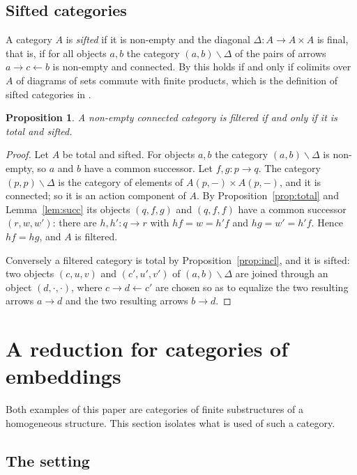 \documentclass[11pt,a4paper]{article}
\newtheorem{proposition}[theorem]{Proposition}
\theoremstyle{definition}
\begin{document}
\subsection{Sifted categories}

A category $A$ is \emph{sifted} if it is non-empty and the diagonal
$\Delta\colon A\to A\times A$ is final, that is, if for all objects $a,b$ the
category $(a,b)\backslash\Delta$ of the pairs of arrows $a\to c\leftarrow b$ is
non-empty and connected. By \cite[Theorem~1.6]{AR} this holds if and only if
colimits over $A$ of diagrams of sets commute with finite products, which is
the definition of sifted categories in \cite[Definition~1.1]{AR}.

\begin{proposition}\label{prop:sifted}
A non-empty connected category is filtered if and only if it is total and
sifted.
\end{proposition}

\begin{proof}
Let $A$ be total and sifted. For objects $a,b$ the category
$(a,b)\backslash\Delta$ is non-empty, so $a$ and $b$ have a common successor.
Let $f,g\colon p\to q$. The category $(p,p)\backslash\Delta$ is the category
of elements of $A(p,-)\times A(p,-)$, and it is connected; so it is an action
component of $A$. By Proposition~\ref{prop:total} and Lemma~\ref{lem:succ}
its objects $(q,f,g)$ and $(q,f,f)$ have a common successor $(r,w,w')$:
there are $h,h'\colon q\to r$ with $hf=w=h'f$ and $hg=w'=h'f$. Hence $hf=hg$,
and $A$ is filtered.

Conversely a filtered category is total by Proposition~\ref{prop:incl}, and
it is sifted: two objects $(c,u,v)$ and $(c',u',v')$ of
$(a,b)\backslash\Delta$ are joined through an object $(d,\cdot,\cdot)$, where
$c\to d\leftarrow c'$ are chosen so as to equalize the two resulting arrows
$a\to d$ and the two resulting arrows $b\to d$.
\end{proof}
\section{A reduction for categories of embeddings}\label{sec:reduction}

Both examples of this paper are categories of finite substructures of a
homogeneous structure. This section isolates what is used of such a category.

\subsection{The setting}
\end{document}
